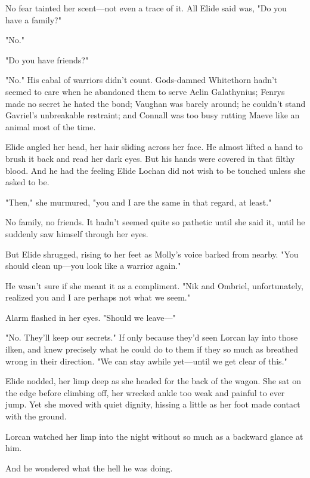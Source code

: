 No fear tainted her scent---not even a trace of it.
All Elide said was, "Do you have a family?"

"No."

"Do you have friends?"

"No."
His cabal of warriors didn't count.
Gods-damned Whitethorn hadn't seemed to care when he abandoned them to serve Aelin Galathynius;
Fenrys made no secret he hated the bond; Vaughan was barely around; he couldn't stand Gavriel's unbreakable restraint; and Connall was too busy rutting Maeve like an animal most of the time.

Elide angled her head, her hair sliding across her face.
He almost lifted a hand to brush it back and read her dark eyes.
But his hands were covered in that filthy blood.
And he had the feeling Elide Lochan did not wish to be touched unless she asked to be.

"Then," she murmured, "you and I are the same in that regard, at least."

No family, no friends.
It hadn't seemed quite so pathetic until she said it, until he suddenly saw himself through her eyes.

But Elide shrugged, rising to her feet as Molly's voice barked from nearby.
"You should clean up---you look like a warrior again."

He wasn't sure if she meant it as a compliment.
"Nik and Ombriel, unfortunately, realized you and I are perhaps not what we seem."

Alarm flashed in her eyes.
"Should we leave---"

"No.
They'll keep our secrets."
If only because they'd seen Lorcan lay into those ilken, and knew precisely what he could do to them if they so much as breathed wrong in their direction.
"We can stay awhile yet---until we get clear of this."

Elide nodded, her limp deep as she headed for the back of the wagon.
She sat on the edge before climbing off, her wrecked ankle too weak and painful to ever jump.
Yet she moved with quiet dignity, hissing a little as her foot made contact with the ground.

Lorcan watched her limp into the night without so much as a backward glance at him.

And he wondered what the hell he was doing.
